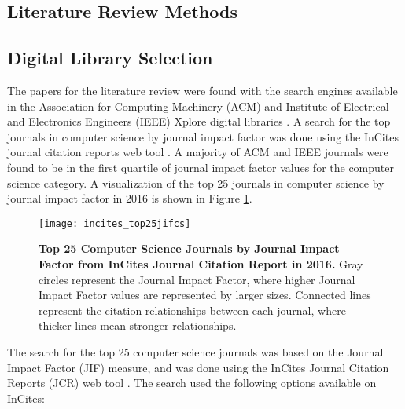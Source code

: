 



\begin{appendices}

\section{Literature Review Methods}  \label{appendix:literature-review-methods}

\subsection{Digital Library Selection} \label{appendix:digital-library-selection}

The papers for the literature review were found with the search engines available in the Association for Computing Machinery (ACM) \citep{ACM:2017} and Institute of Electrical and Electronics Engineers (IEEE) Xplore digital libraries \citep{IEEE:2017}. A search for the top journals in computer science by journal impact factor \citep{Garfield:2006b} was done using the InCites journal citation reports web tool \citep{Clarivate:2017a}. A majority of ACM and IEEE journals were found to be in the first quartile of journal impact factor values for the computer science category. A visualization of the top 25 journals in computer science by journal impact factor in 2016 is shown in Figure \ref{figure:incites_top25jifcs}.

\begin{figure}[!htb]
	\centering
	\texttt{[image: incites\_top25jifcs]}
	\caption{\textbf{Top 25 Computer Science Journals by Journal Impact Factor from InCites Journal Citation Report in 2016.} Gray circles represent the Journal Impact Factor, where higher Journal Impact Factor values are represented by larger sizes. Connected lines represent the citation relationships between each journal, where thicker lines mean stronger relationships.}
	\label{figure:incites_top25jifcs}
\end{figure}

The search for the top 25 computer science journals was based on the Journal Impact Factor (JIF) \citep{Garfield:2006b} measure, and was done using the InCites Journal Citation Reports (JCR) web tool \citep{Clarivate:2017a}. The search used the following options available on InCites:


\end{appendices}
